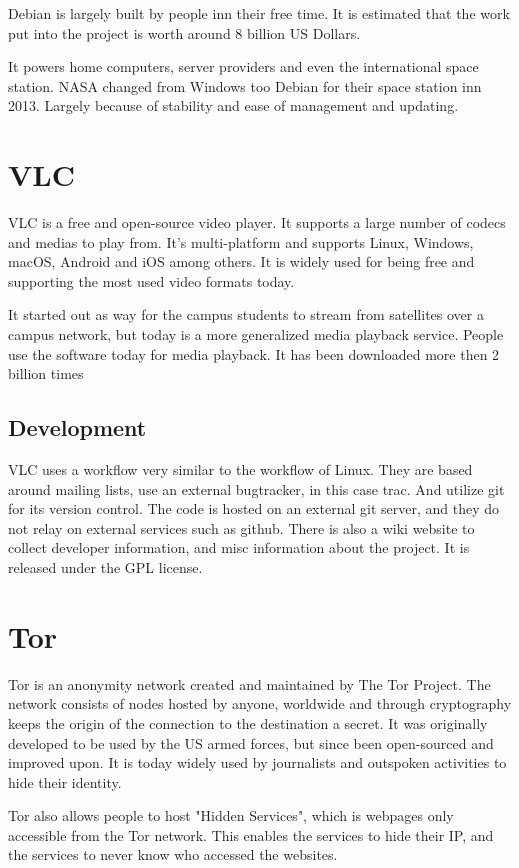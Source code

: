 \documentclass[12pt]{article}
\begin{document}
Debian is largely built by people inn their free time. It is estimated that the
work put into the project is worth around 8 billion US Dollars.

It powers home computers, server providers and even the international space
station. NASA changed from Windows too Debian for their space station inn 2013.
Largely because of stability and ease of management and updating\cite{nasa}.

\section{VLC}
VLC is a free and open-source video player. It supports a large number of
codecs and medias to play from. It's multi-platform and supports Linux, Windows,
macOS, Android and iOS among others. It is widely used for being free and
supporting the most used video formats today. 

It started out as way for the campus students to stream from satellites over a
campus network, but today is a more generalized media playback service. People
use the software today for media playback. It has been downloaded more then 2
billion times


\subsection{Development}
VLC uses a workflow very similar to the workflow of Linux. They are based
around mailing lists, use an external bugtracker, in this case trac. And utilize
git for its version control. The code is hosted on an external git server, and
they do not relay on external services such as github.  There is also a wiki
website to collect developer information, and misc information about the
project. It is released under the GPL license.


\section{Tor}
Tor is an anonymity network created and maintained by The Tor Project.  The
network consists of nodes hosted by anyone, worldwide and through cryptography
keeps the origin of the connection to the destination a secret. It was
originally developed to be used by the US armed forces, but since been
open-sourced and improved upon. It is today widely used by journalists and
outspoken activities to hide their identity\cite{about-tor}.

Tor also allows people to host "Hidden Services", which is webpages only
accessible from the Tor network. This enables the services to hide their IP, and
the services to never know who accessed the websites.
\end{document}
